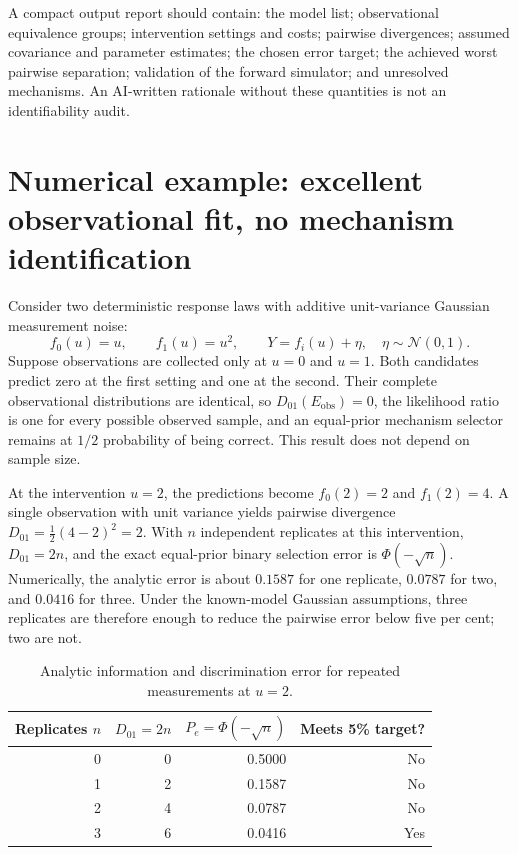 \documentclass[11pt]{article}
\begin{document}
A compact output report should contain: the model list; observational equivalence groups; intervention settings and costs; pairwise divergences; assumed covariance and parameter estimates; the chosen error target; the achieved worst pairwise separation; validation of the forward simulator; and unresolved mechanisms. An AI-written rationale without these quantities is not an identifiability audit.

\section{Numerical example: excellent observational fit, no mechanism identification}
Consider two deterministic response laws with additive unit-variance Gaussian measurement noise:
\begin{equation}
f_0(u)=u,\qquad f_1(u)=u^2,\qquad Y=f_i(u)+\eta,\quad\eta\sim\mathcal{N}(0,1).
\end{equation}
Suppose observations are collected only at $u=0$ and $u=1$. Both candidates predict zero at the first setting and one at the second. Their complete observational distributions are identical, so $D_{01}(E_{\mathrm{obs}})=0$, the likelihood ratio is one for every possible observed sample, and an equal-prior mechanism selector remains at $1/2$ probability of being correct. This result does not depend on sample size.

At the intervention $u=2$, the predictions become $f_0(2)=2$ and $f_1(2)=4$. A single observation with unit variance yields pairwise divergence $D_{01}=\tfrac12(4-2)^2=2$. With $n$ independent replicates at this intervention, $D_{01}=2n$, and the exact equal-prior binary selection error is $\Phi(-\sqrt{n})$. Numerically, the analytic error is about $0.1587$ for one replicate, $0.0787$ for two, and $0.0416$ for three. Under the known-model Gaussian assumptions, three replicates are therefore enough to reduce the pairwise error below five per cent; two are not.

\begin{table}[ht]
\centering
\caption{Analytic information and discrimination error for repeated measurements at $u=2$.}
\begin{tabular}{rrrr}
\toprule
Replicates $n$ & $D_{01}=2n$ & $P_e=\Phi(-\sqrt{n})$ & Meets 5\% target?\\
\midrule
0 & 0 & 0.5000 & No\\
1 & 2 & 0.1587 & No\\
2 & 4 & 0.0787 & No\\
3 & 6 & 0.0416 & Yes\\
\bottomrule
\end{tabular}
\end{table}
\end{document}
